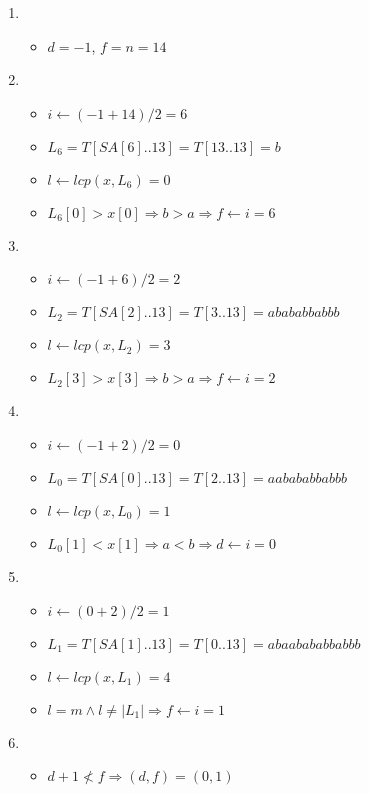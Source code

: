 \begin{enumerate}
	\item \begin{itemize}
			\item $d = -1$, $f = n = 14$
		\end{itemize}
	\item \begin{itemize}
		\item $i \leftarrow (-1 + 14)/2 = 6$
		\item $L_6 = T[SA[6] .. 13] = T[13 .. 13] = b$
		\item $l \leftarrow lcp(x, L_6) = 0$
		\item $L_6[0] > x[0] \Rightarrow b > a \Rightarrow f \leftarrow i = 6$
	\end{itemize}
	\item \begin{itemize}
		\item $i \leftarrow (-1 + 6)/2 = 2$
		\item $L_2 = T[SA[2] .. 13] = T[3 .. 13] = abababbabbb$
		\item $l \leftarrow lcp(x, L_2) = 3$
		\item $L_2[3] > x[3] \Rightarrow b > a \Rightarrow f \leftarrow i = 2$
	\end{itemize}
\item \begin{itemize}
		\item $i \leftarrow (-1 + 2)/2 = 0$
		\item $L_0 = T[SA[0] .. 13] = T[2 .. 13] = aabababbabbb$
		\item $l \leftarrow lcp(x, L_0) = 1$
		\item $L_0[1] < x[1] \Rightarrow a < b \Rightarrow d \leftarrow i = 0$
	\end{itemize}
\item \begin{itemize}
		\item $i \leftarrow (0 + 2)/2 = 1$
		\item $L_1 = T[SA[1] .. 13] = T[0 .. 13] = abaabababbabbb$
		\item $l \leftarrow lcp(x, L_1) = 4$
		\item $l = m \wedge l \neq |L_1| \Rightarrow f \leftarrow i = 1$
	\end{itemize}
\item \begin{itemize}
		\item $d+1 \not< f \Rightarrow (d, f) = (0, 1)$
	\end{itemize}
\end{enumerate}

